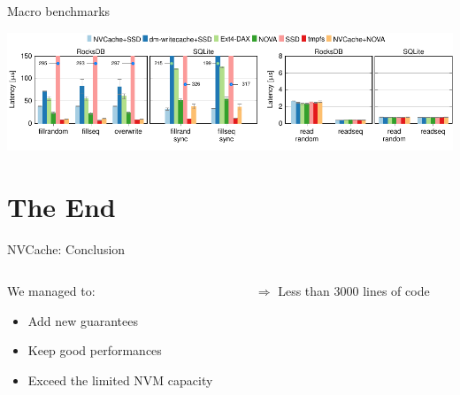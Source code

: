 \documentclass[presentation]{beamer}
\begin{document}
\begin{frame}[label={sec:orga61528b}]{Macro benchmarks}
\begin{block}{}
\begin{center}
\includegraphics[width=.9\linewidth]{./IMGs/paper-figure0.pdf}
\end{center}
\end{block}
\end{frame}


\section{The End}
\label{sec:orgd926b06}

\begin{frame}[label={sec:orgacdc1dc}]{NVCache: Conclusion}
\begin{columns}
\begin{column}{0.6\columnwidth}
\begin{block}{We managed to:}
\begin{itemize}
\item Add new guarantees\\
\item Keep good performances\\
\item Exceed the limited NVM capacity\\
\end{itemize}
\end{block}
\end{column}

\begin{column}{0.4\columnwidth}
\begin{block}{\(\Rightarrow\) Less than 3000 lines of code}
\end{block}
\end{column}
\end{columns}
\end{frame}
\end{document}
